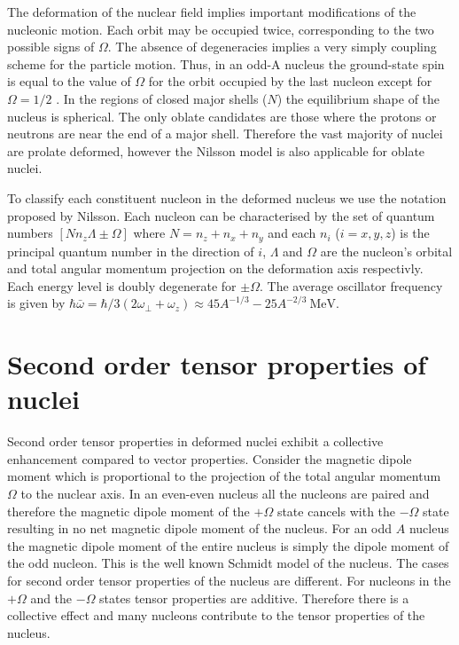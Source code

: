 \documentclass[10pt,a4paper, twoside]{report}
\begin{document}
The deformation of the nuclear field implies important modifications of the nucleonic motion. Each orbit may be occupied twice, corresponding to the two possible signs of $\Omega$. The absence of degeneracies implies a very simply coupling scheme for the particle motion. Thus, in an odd-A nucleus the ground-state spin is equal to the value of $\Omega$ for the orbit occupied by the last nucleon except for $\Omega=1/2$ \cite{Nilsson1955}.  In the regions of closed major shells ($N$) the equilibrium shape of the nucleus is spherical. The only oblate candidates are those where the protons or neutrons are near the end of a major shell. Therefore the vast majority of nuclei are prolate deformed, however the Nilsson model is also applicable for oblate nuclei. 


To classify each constituent nucleon in the deformed nucleus we use the notation proposed by Nilsson\cite{Nilsson1955, BohrMottVol2}. Each nucleon can be characterised by the set of quantum numbers $\left[N n_z \Lambda \pm\Omega\right]$ \cite{BohrMottVol2}  where $N = n_z + n_x + n_y$ and each $n_i$ ($i = x, y, z$) is the principal quantum number in the direction of $i$, $\Lambda$ and $\Omega$ are the nucleon's orbital and total angular momentum projection on the deformation axis respectivly. Each energy level is doubly degenerate for $\pm\Omega$. The average oscillator frequency is given by $\hbar\bar{\omega} = \hbar/3\left(2\omega_{\perp} + \omega_z\right) \approx 45A^{-1/3} - 25A^{-2/3} \ \text{MeV}$\cite{Brown2016}. 


\section{Second order tensor properties of nuclei}

Second order tensor properties  in deformed nuclei exhibit a collective enhancement compared to vector properties. Consider the magnetic dipole moment  which is proportional to  the projection of the total angular momentum $\Omega$ to the nuclear axis. In an even-even nucleus all the nucleons are paired and therefore the magnetic dipole moment of the $+\Omega$ state cancels with the $-\Omega$ state resulting in no net magnetic dipole moment of the nucleus. For an odd $A$ nucleus  the magnetic dipole moment of the entire nucleus is simply the dipole moment of the odd nucleon. This is the well known Schmidt model of the nucleus. The cases for second order tensor properties of the nucleus are different. For  nucleons in the  $+\Omega$ and the $-\Omega$ states tensor properties  are additive. Therefore there is a collective effect and many nucleons contribute to the tensor properties of the nucleus.
\end{document}
